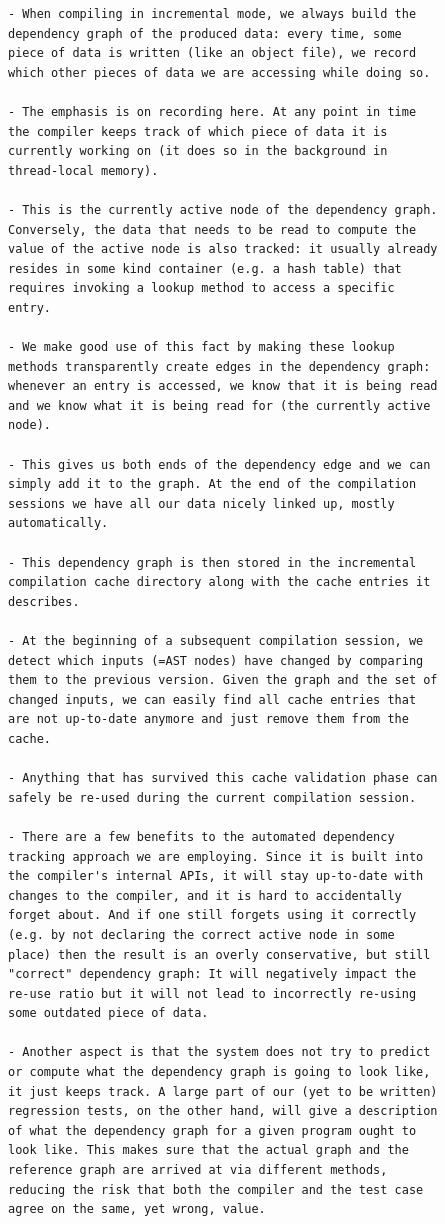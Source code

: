 \documentclass[12pt, a4paper]{report}
\begin{document}
\begin{verbatim}
- When compiling in incremental mode, we always build the
dependency graph of the produced data: every time, some
piece of data is written (like an object file), we record
which other pieces of data we are accessing while doing so.

- The emphasis is on recording here. At any point in time
the compiler keeps track of which piece of data it is
currently working on (it does so in the background in
thread-local memory).

- This is the currently active node of the dependency graph.
Conversely, the data that needs to be read to compute the
value of the active node is also tracked: it usually already
resides in some kind container (e.g. a hash table) that
requires invoking a lookup method to access a specific
entry.

- We make good use of this fact by making these lookup
methods transparently create edges in the dependency graph:
whenever an entry is accessed, we know that it is being read
and we know what it is being read for (the currently active
node).

- This gives us both ends of the dependency edge and we can
simply add it to the graph. At the end of the compilation
sessions we have all our data nicely linked up, mostly
automatically.

- This dependency graph is then stored in the incremental
compilation cache directory along with the cache entries it
describes.

- At the beginning of a subsequent compilation session, we
detect which inputs (=AST nodes) have changed by comparing
them to the previous version. Given the graph and the set of
changed inputs, we can easily find all cache entries that
are not up-to-date anymore and just remove them from the
cache.

- Anything that has survived this cache validation phase can
safely be re-used during the current compilation session.

- There are a few benefits to the automated dependency
tracking approach we are employing. Since it is built into
the compiler's internal APIs, it will stay up-to-date with
changes to the compiler, and it is hard to accidentally
forget about. And if one still forgets using it correctly
(e.g. by not declaring the correct active node in some
place) then the result is an overly conservative, but still
"correct" dependency graph: It will negatively impact the
re-use ratio but it will not lead to incorrectly re-using
some outdated piece of data.

- Another aspect is that the system does not try to predict
or compute what the dependency graph is going to look like,
it just keeps track. A large part of our (yet to be written)
regression tests, on the other hand, will give a description
of what the dependency graph for a given program ought to
look like. This makes sure that the actual graph and the
reference graph are arrived at via different methods,
reducing the risk that both the compiler and the test case
agree on the same, yet wrong, value.
\end{verbatim}
\cite{rust_blog_incremental_compilation}
\end{document}
